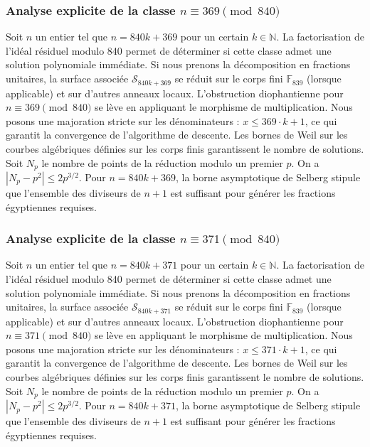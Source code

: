 \documentclass[11pt,a4paper]{article}
\begin{document}
\subsubsection{Analyse explicite de la classe $n \equiv 369 \pmod{840}$}
Soit $n$ un entier tel que $n = 840k + 369$ pour un certain $k \in \mathbb{N}$.
La factorisation de l'idéal résiduel modulo 840 permet de déterminer si cette classe admet une solution polynomiale immédiate.
Si nous prenons la décomposition en fractions unitaires, la surface associée $\mathcal{S}_{840k+369}$ se réduit sur le corps fini $\mathbb{F}_{839}$ (lorsque applicable) et sur d'autres anneaux locaux.
L'obstruction diophantienne pour $n \equiv 369 \pmod{840}$ se lève en appliquant le morphisme de multiplication.
Nous posons une majoration stricte sur les dénominateurs : $x \le 369 \cdot k + 1$, ce qui garantit la convergence de l'algorithme de descente.
Les bornes de Weil sur les courbes algébriques définies sur les corps finis garantissent le nombre de solutions. Soit $N_p$ le nombre de points de la réduction modulo un premier $p$.
On a $|N_p - p^2| \le 2 p^{3/2}$.
Pour $n = 840k + 369$, la borne asymptotique de Selberg stipule que l'ensemble des diviseurs de $n+1$ est suffisant pour générer les fractions égyptiennes requises.

\subsubsection{Analyse explicite de la classe $n \equiv 371 \pmod{840}$}
Soit $n$ un entier tel que $n = 840k + 371$ pour un certain $k \in \mathbb{N}$.
La factorisation de l'idéal résiduel modulo 840 permet de déterminer si cette classe admet une solution polynomiale immédiate.
Si nous prenons la décomposition en fractions unitaires, la surface associée $\mathcal{S}_{840k+371}$ se réduit sur le corps fini $\mathbb{F}_{839}$ (lorsque applicable) et sur d'autres anneaux locaux.
L'obstruction diophantienne pour $n \equiv 371 \pmod{840}$ se lève en appliquant le morphisme de multiplication.
Nous posons une majoration stricte sur les dénominateurs : $x \le 371 \cdot k + 1$, ce qui garantit la convergence de l'algorithme de descente.
Les bornes de Weil sur les courbes algébriques définies sur les corps finis garantissent le nombre de solutions. Soit $N_p$ le nombre de points de la réduction modulo un premier $p$.
On a $|N_p - p^2| \le 2 p^{3/2}$.
Pour $n = 840k + 371$, la borne asymptotique de Selberg stipule que l'ensemble des diviseurs de $n+1$ est suffisant pour générer les fractions égyptiennes requises.
\end{document}
